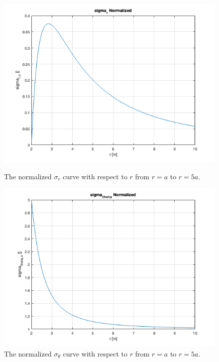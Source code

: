 \documentclass[12 pt]{article}
\begin{document}
\begin{figure}[htbp]
    \centering
    \begin{minipage}{0.45\textwidth}
        \centering
		\includegraphics[width=1.0\textwidth]{images/Graphs/sigma_r_normalized}
		\caption{The normalized $\sigma_r$ curve with respect to $r$ from $r=a$ to $r=5a$.}
		\label{fig:norm_sigma_r}
    \end{minipage}\hfill
    \begin{minipage}{0.45\textwidth}
        \centering
		\includegraphics[width=1.0\textwidth]{images/Graphs/sigma_theta_normalized}
		\caption{The normalized $\sigma_\theta$ curve with respect to $r$ from $r=a$ to $r=5a$.}
		\label{fig:norm_sigma_theta}
    \end{minipage}
\end{figure}
\end{document}
